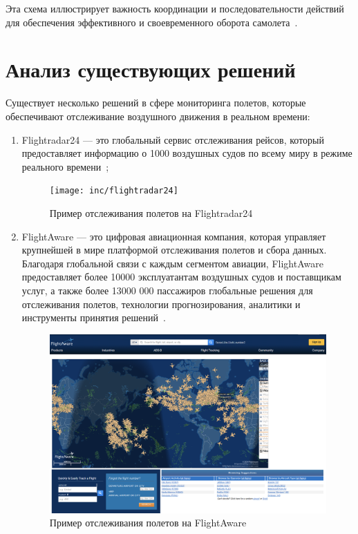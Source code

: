 Эта схема иллюстрирует важность координации и последовательности действий для обеспечения эффективного и своевременного оборота самолета~\cite{trt-timeestimation}.


\section{Анализ существующих решений}

Существует несколько решений в сфере мониторинга полетов, которые обеспечивают отслеживание воздушного движения в реальном времени:
\begin{enumerate}[label=\arabic*)]
    \item Flightradar24 --- это глобальный сервис отслеживания рейсов, который предоставляет информацию о 1000 воздушных судов по всему миру в режиме реального времени~\cite{flightradar24};
    \begin{figure}[h]
        \centering
        \texttt{[image: inc/flightradar24]}
        \caption{Пример отслеживания полетов на Flightradar24}
        \label{fig:flightradar24}
    \end{figure}
    \item FlightAware --- это цифровая авиационная компания, которая управляет крупнейшей в мире платформой отслеживания полетов и сбора данных.
    Благодаря глобальной связи с каждым сегментом авиации, FlightAware предоставляет более 10000 эксплуатантам воздушных судов и поставщикам услуг, а также более 13000 000 пассажиров глобальные решения для отслеживания полетов, технологии прогнозирования, аналитики и инструменты принятия решений~\cite{flightaware}.
    \begin{figure}[h]
        \centering
        \includegraphics[scale=0.3]{inc/flightaware}
        \caption{Пример отслеживания полетов на FlightAware}
        \label{fig:flightaware}
    \end{figure}
\end{enumerate}



